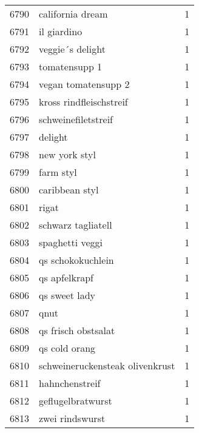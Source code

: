 \begin{tabular}{llr}
6790 &                                   california dream &      1 \\
6791 &                                        il giardino &      1 \\
6792 &                                   veggie´s delight &      1 \\
6793 &                                      tomatensupp 1 &      1 \\
6794 &                                vegan tomatensupp 2 &      1 \\
6795 &                            kross rindfleischstreif &      1 \\
6796 &                                schweinefiletstreif &      1 \\
6797 &                                            delight &      1 \\
6798 &                                      new york styl &      1 \\
6799 &                                          farm styl &      1 \\
6800 &                                     caribbean styl &      1 \\
6801 &                                              rigat &      1 \\
6802 &                                 schwarz tagliatell &      1 \\
6803 &                                    spaghetti veggi &      1 \\
6804 &                                  qs schokokuchlein &      1 \\
6805 &                                      qs apfelkrapf &      1 \\
6806 &                                      qs sweet lady &      1 \\
6807 &                                               qnut &      1 \\
6808 &                                qs frisch obstsalat &      1 \\
6809 &                                      qs cold orang &      1 \\
6810 &                    schweineruckensteak olivenkrust &      1 \\
6811 &                                     hahnchenstreif &      1 \\
6812 &                                  geflugelbratwurst &      1 \\
6813 &                                    zwei rindswurst &      1 \\

\end{tabular}
